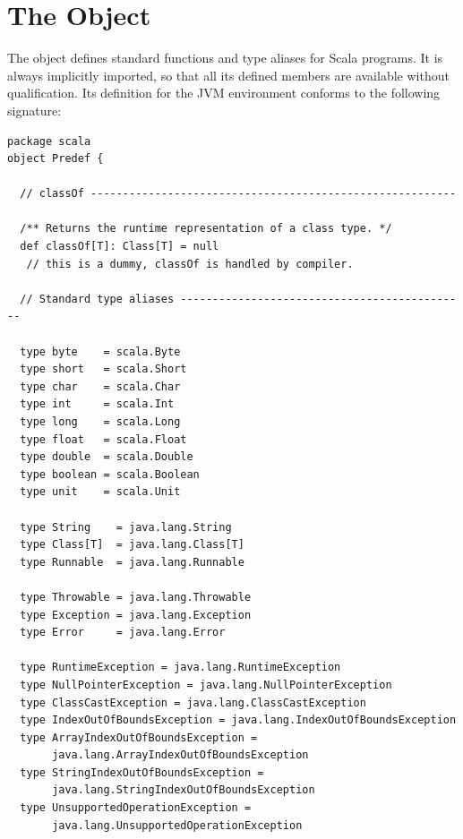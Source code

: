 \newpage
\section{The \large{} Object}\label{cls:predef}

The  object defines standard functions and type aliases
for Scala programs. It is always implicitly imported, so that all its
defined members are available without qualification. Its definition
for the JVM environment conforms to the following signature:

\begin{lstlisting}
package scala
object Predef {

  // classOf ---------------------------------------------------------

  /** Returns the runtime representation of a class type. */
  def classOf[T]: Class[T] = null  
   // this is a dummy, classOf is handled by compiler.

  // Standard type aliases ---------------------------------------------

  type byte    = scala.Byte
  type short   = scala.Short
  type char    = scala.Char
  type int     = scala.Int
  type long    = scala.Long
  type float   = scala.Float
  type double  = scala.Double
  type boolean = scala.Boolean
  type unit    = scala.Unit

  type String    = java.lang.String
  type Class[T]  = java.lang.Class[T]
  type Runnable  = java.lang.Runnable

  type Throwable = java.lang.Throwable
  type Exception = java.lang.Exception
  type Error     = java.lang.Error

  type RuntimeException = java.lang.RuntimeException
  type NullPointerException = java.lang.NullPointerException
  type ClassCastException = java.lang.ClassCastException
  type IndexOutOfBoundsException = java.lang.IndexOutOfBoundsException
  type ArrayIndexOutOfBoundsException = 
       java.lang.ArrayIndexOutOfBoundsException
  type StringIndexOutOfBoundsException = 
       java.lang.StringIndexOutOfBoundsException
  type UnsupportedOperationException = 
       java.lang.UnsupportedOperationException
\end{lstlisting}
\newpage
